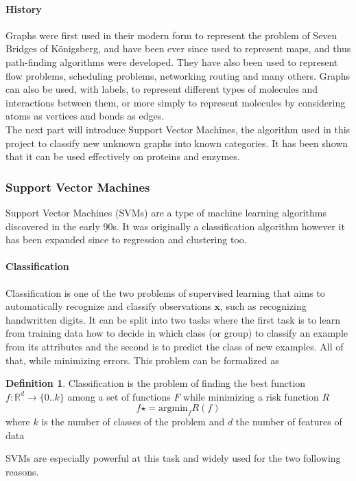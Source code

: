 \documentclass{article}
\let\vec\mathbf
\newcommand*{\R}{%
  \mathbb{R}%
}
\theoremstyle{definition}
\newtheorem{definition}{Definition}
\begin{document}
\paragraph{History} Graphs were first used in their modern form to represent the problem of Seven Bridges of Königsberg, and have been ever since used to represent maps, and thus path-finding algorithms were developed. They have also been used to represent flow problems, scheduling problems, networking routing and many others. Graphs can also be used, with labels, to represent different types of molecules and interactions between them, or more simply to represent molecules by considering atoms as vertices and bonds as edges.\\
The next part will introduce Support Vector Machines, the algorithm used in this project to classify new unknown graphs into known categories. It has been shown\cite{borgwardt_protein_2005} that it can be used effectively on proteins and enzymes.

\subsubsection{Support Vector Machines}
Support Vector Machines (SVMs)\cite{burges_tutorial_1998} are a type of machine learning algorithms discovered in the early 90s\cite{cortes_support-vector_1995}. It was originally a classification algorithm however it has been expanded since to regression and clustering too. 
\paragraph{Classification}
Classification is one of the two problems of supervised learning that aims to automatically recognize and classify observations $\vec{x}$, such as recognizing handwritten digits. It can be split into two tasks where the first task is to learn from training data how to decide in which class (or group) to classify an example from its attributes and the second is to predict the class of new examples. All of that, while minimizing errors. This problem can be formalized as
\begin{definition}
	Classification is the problem of finding the best function $f :  \R^d \longrightarrow \{0..k\}$ among a set of functions $F$ while minimizing a risk function $R$
	\begin{equation}
		f\star = \mbox{argmin}_f R(f)
	\end{equation}
	 where $k$ is the number of classes of the problem and $d$ the number of features of data 
\end{definition}
SVMs are especially powerful at this task and widely used for the two following reasons.
\end{document}
